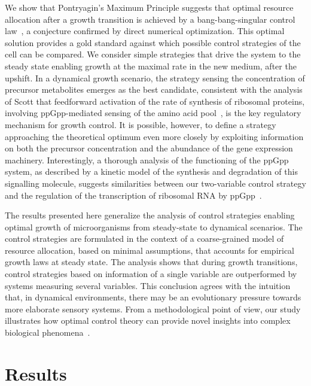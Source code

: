 We show that Pontryagin's Maximum Principle suggests that optimal resource allocation after a growth transition is achieved by a bang-bang-singular control law~\cite{stengel_optimal_1994}, a conjecture confirmed by direct numerical optimization.
This optimal solution provides a gold standard against which possible control strategies of the cell can be compared.
We consider simple strategies that drive the system to the steady state enabling growth at the maximal rate in the new medium, after the upshift.
In a dynamical growth scenario, the strategy sensing the concentration of precursor metabolites emerges as the best candidate, consistent with the analysis of Scott \etal that feedforward activation of the rate of synthesis of ribosomal proteins, involving ppGpp-mediated sensing of the amino acid pool~\cite{dalebroux_ppgpp_2012,potrykus_pppgpp_2008,hauryliuk_recent_2015}, is the key regulatory mechanism for growth control.
It is possible, however, to define a strategy approaching the theoretical optimum even more closely by exploiting information on both the precursor concentration and the abundance of the gene expression machinery.
Interestingly, a thorough analysis of the functioning of the ppGpp system, as described by a kinetic model of the synthesis and degradation of this signalling molecule, suggests similarities between our two-variable control strategy and the regulation of the transcription of ribosomal RNA by ppGpp~\cite{bosdriesz_how_2015}.

The results presented here generalize the analysis of control strategies enabling optimal growth of microorganisms from steady-state to dynamical scenarios.
The control strategies are formulated in the context of a coarse-grained model of resource allocation, based on minimal assumptions, that accounts for empirical growth laws at steady state.
The analysis shows that during growth transitions, control strategies based on information of a single variable are outperformed by systems measuring several variables.
This conclusion agrees with the intuition that, in dynamical environments, there may be an evolutionary pressure towards more elaborate sensory systems.
From a methodological point of view, our study illustrates how optimal control theory can provide novel insights into complex biological phenomena~\cite{iglesias_control_2010}. 


\section*{Results}

